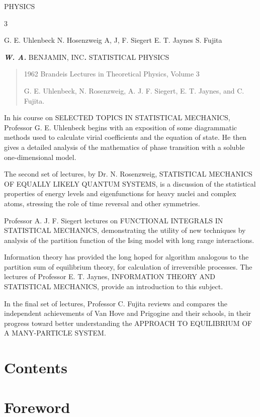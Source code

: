 \documentclass[]{article}
\begin{document}
PHYSICS

3

G. E. Uhlenbeck N. Hosenzweig A, J, F. Siegert E. T. Jaynes S. Fujita

\emph{\textbf{W. A.}} BENJAMIN, INC\emph{\textbf{.}} STATISTICAL PHYSICS

\begin{quote}
1962 Brandeis Lectures in Theoretical Physics, Volume 3

G. E. Uhlenbeck, N. Rosenzweig, A. J. F. Siegert, E. T. Jaynes, and C.
Fujita.
\end{quote}

In his course on SELECTED TOPICS IN STATISTICAL MECHANICS, Professor G.
E. Uhlenbeck begins with an exposition of some diagrammatic methods used
to calculate virial coefficients and the equation of state. He then
gives a detailed analysis of the mathematics of phase transition with a
soluble one-dimensional model.

The second set of lectures, by Dr. N. Rosenzweig, STATISTICAL MECHANICS
OF EQUALLY LIKELY QUANTUM SYSTEMS, is a discussion of the statistical
properties of energy levels and eigenfunctions for heavy nuclei and
complex atoms, stressing the role of time reversal and other symmetries.

Professor A. J. F. Siegert lectures on FUNCTIONAL INTEGRALS IN
STATISTICAL MECHANICS, demonstrating the utility of new techniques by
analysis of the partition function of the Ising model with long range
interactions.

Information theory has provided the long hoped for algorithm analogous
to the partition sum of equilibrium theory, for calculation of
irreversible processes. The lectures of Professor E. T. Jaynes,
INFORMATION THEORY AND STATISTICAL MECHANICS, provide an introduction to
this subject.

In the final set of lectures, Professor C. Fujita reviews and compares
the independent achievements of Van Hove and Prigogine and their
schools, in their progress toward better understanding the APPROACH TO
EQUILIBRIUM OF A MANY-PARTICLE SYSTEM.

\section{Contents}

\tableofcontents

\section{Foreword}
\end{document}
